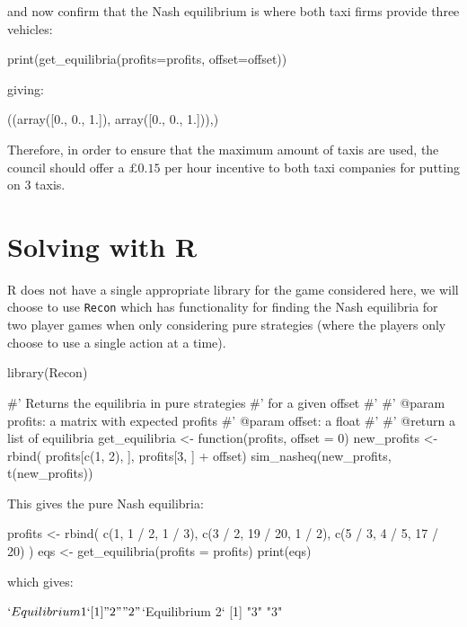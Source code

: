 and now confirm that the Nash equilibrium is where both taxi firms provide
three vehicles:

\begin{pyin}
print(get_equilibria(profits=profits, offset=offset))
\end{pyin}

giving:

\begin{pyout}
((array([0., 0., 1.]), array([0., 0., 1.])),)
\end{pyout}

Therefore, in order to ensure that the maximum amount of taxis are used, the
council should offer a \(\pounds 0.15\) per hour incentive to both taxi
companies for putting on 3 taxis.

\section{Solving with R}\label{sec:solving-with-R}

R does not have a single appropriate library for the game considered here, we
will choose to use \texttt{Recon} which has functionality for finding the
Nash equilibria for two player games when only considering pure strategies
(where the players only choose to use a single action at a time).

\begin{Rin}
library(Recon)

#' Returns the equilibria in pure strategies
#' for a given offset
#'
#' @param profits: a matrix with expected profits
#' @param offset: a float
#'
#' @return a list of equilibria
get_equilibria <- function(profits, offset = 0){
    new_profits <- rbind(
                profits[c(1, 2), ],
                profits[3, ] + offset)
    sim_nasheq(new_profits, t(new_profits))
}
\end{Rin}


This gives the pure Nash equilibria:

\begin{Rin}

profits <- rbind(
        c(1, 1 / 2, 1 / 3),
        c(3 / 2, 19 / 20, 1 / 2),
        c(5 / 3, 4 / 5, 17 / 20)
    )
eqs <- get_equilibria(profits = profits)
print(eqs)
\end{Rin}

which gives:

\begin{Rout}
$`Equilibrium 1`
[1] "2" "2"

$`Equilibrium 2`
[1] "3" "3"

\end{Rout}


